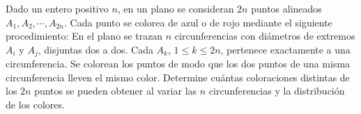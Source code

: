 Dado un entero positivo $n$, en un plano se consideran $2n$ puntos alineados $A_1, A_2, \cdots, A_{2n}$. Cada punto se colorea de azul o de rojo mediante el siguiente procedimiento: \newline 
En el plano se trazan $n$ circunferencias con diámetros de extremos $A_i$ y $A_j$, disjuntas dos a dos. Cada $A_k$, $1 \leq k \leq 2n$, pertenece exactamente a una circunferencia. Se colorean los puntos de modo que los dos puntos de una misma circunferencia lleven el mismo color. \newline 
Determine cuántas coloraciones distintas de los $2n$ puntos se pueden obtener al variar las $n$ circunferencias y la distribución de los colores.
